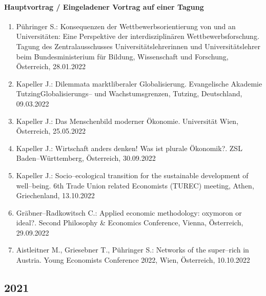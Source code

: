 \paragraph{Hauptvortrag / Eingeladener Vortrag auf einer Tagung}
\begin{enumerate}
	\item Pühringer S.: Konsequenzen der Wettbewerbsorientierung von und an Universitäten: Eine Perspektive der interdisziplinären Wettbewerbsforschung. Tagung des Zentralausschusses Universitätslehrerinnen und Universitätslehrer beim Bundesministerium für Bildung, Wissenschaft und Forschung, Österreich, 28.01.2022
	\item Kapeller J.: Dilemmata marktliberaler Globalisierung. Evangelische Akademie TutzingGlobalisierungs-- und Wachstumsgrenzen, Tutzing, Deutschland, 09.03.2022
	\item Kapeller J.: Das Menschenbild moderner Ökonomie. Universität Wien, Österreich, 25.05.2022
	\item Kapeller J.: Wirtschaft anders denken! Was ist plurale Ökonomik?. ZSL Baden--Württemberg, Österreich, 30.09.2022
	\item Kapeller J.: Socio--ecological transition for the sustainable development of well--being. 6th Trade Union related Economists (TUREC) meeting, Athen, Griechenland, 13.10.2022
	\item Gräbner--Radkowitsch C.: Applied economic methodology: oxymoron or ideal?. Second Philosophy \& Economics Conference, Vienna, Österreich, 29.09.2022
	\item Aistleitner M., Griesebner T., Pühringer S.: Networks of the super--rich in Austria. Young Economists Conference 2022, Wien, Österreich, 10.10.2022
\end{enumerate}
\subsection*{2021}
